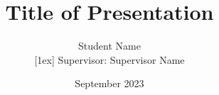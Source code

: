 \title[Title Short]{Title of Presentation}
\author[Name]{Student Name \texorpdfstring{\\}{and}[1ex] {\small Supervisor: Supervisor Name}}
\date[]{September 2023}